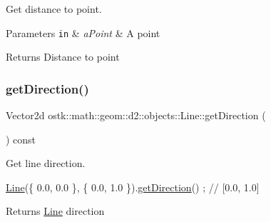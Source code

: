 Get distance to point. 


\begin{DoxyParams}[1]{Parameters}
\mbox{\tt in}  & {\em a\+Point} & A point \\
\hline
\end{DoxyParams}
\begin{DoxyReturn}{Returns}
Distance to point 
\end{DoxyReturn}
\mbox{\label{classostk_1_1math_1_1geom_1_1d2_1_1objects_1_1_line_aaf4b3ec34652358d298315ea1c8072a7}} 
\subsubsection{\texorpdfstring{get\+Direction()}{getDirection()}}
{\footnotesize\ttfamily Vector2d ostk\+::math\+::geom\+::d2\+::objects\+::\+Line\+::get\+Direction (\begin{DoxyParamCaption}{ }\end{DoxyParamCaption}) const}



Get line direction. 


\begin{DoxyCode}
\hyperlink{classostk_1_1math_1_1geom_1_1d2_1_1objects_1_1_line_aa1570ebec4d4f57cbed3c188e6b65613}{Line}(\{ 0.0, 0.0 \}, \{ 0.0, 1.0 \}).\hyperlink{classostk_1_1math_1_1geom_1_1d2_1_1objects_1_1_line_aaf4b3ec34652358d298315ea1c8072a7}{getDirection}() ; \textcolor{comment}{// [0.0, 1.0]}
\end{DoxyCode}


\begin{DoxyReturn}{Returns}
\hyperlink{classostk_1_1math_1_1geom_1_1d2_1_1objects_1_1_line}{Line} direction 
\end{DoxyReturn}
\mbox{\label{classostk_1_1math_1_1geom_1_1d2_1_1objects_1_1_line_aa4c99f38ff7ac4e8fcfe90d9b2bcb0b9}} 
